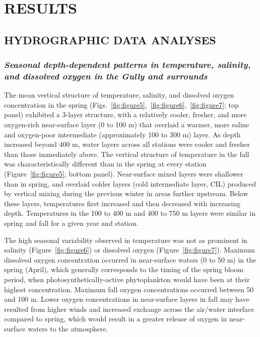 \documentclass[12pt]{article}\usepackage[]{graphicx}\usepackage[]{color}
\begin{document}
\clearpage

\hypertarget{sec:results}{%
\section{RESULTS}\label{sec:results}}

\hypertarget{sec:hydrographic-analyses}{%
\subsection{\texorpdfstring{\textbf{HYDROGRAPHIC DATA ANALYSES}}{HYDROGRAPHIC DATA ANALYSES}}\label{sec:hydrographic-analyses}}

\hypertarget{seasonal-depth-dependent-patterns-in-temperature-salinity-and-dissolved-oxygen-in-the-gully-and-surrounds}{%
\subsubsection{\texorpdfstring{\emph{Seasonal depth-dependent patterns in temperature, salinity, and dissolved oxygen in the Gully and surrounds}}{Seasonal depth-dependent patterns in temperature, salinity, and dissolved oxygen in the Gully and surrounds}}\label{seasonal-depth-dependent-patterns-in-temperature-salinity-and-dissolved-oxygen-in-the-gully-and-surrounds}}

The mean vertical structure of temperature, salinity, and dissolved oxygen concentration in the spring (Figs.~\ref{fig:figure5},~\ref{fig:figure6},~\ref{fig:figure7}; top panel) exhibited a 3-layer structure, with a relatively cooler, fresher, and more oxygen-rich near-surface layer (0 to 100 m) that overlaid a warmer, more saline and oxygen-poor intermediate (approximately 100 to 300 m) layer. As depth increased beyond 400 m, water layers across all stations were cooler and fresher than those immediately above. The vertical structure of temperature in the fall was characteristically different than in the spring at every station (Figure~\ref{fig:figure5}; bottom panel). Near-surface mixed layers were shallower than in spring, and overlaid colder layers (cold intermediate layer, CIL) produced by vertical mixing during the previous winter in areas further upstream. Below these layers, temperatures first increased and then decreased with increasing depth. Temperatures in the 100 to 400 m and 400 to 750 m layers were similar in spring and fall for a given year and station.

The high seasonal variability observed in temperature was not as prominent in salinity (Figure~\ref{fig:figure6}) or dissolved oxygen (Figure~\ref{fig:figure7}). Maximum dissolved oxygen concentration occurred in near-surface waters (0 to 50 m) in the spring (April), which generally corresponds to the timing of the spring bloom period, when photosynthetically-active phytoplankton would have been at their highest concentration. Maximum fall oxygen concentrations occurred between 50 and 100 m. Lower oxygen concentrations in near-surface layers in fall may have resulted from higher winds and increased exchange across the air/water interface compared to spring, which would result in a greater release of oxygen in near-surface waters to the atmosphere.
\end{document}
